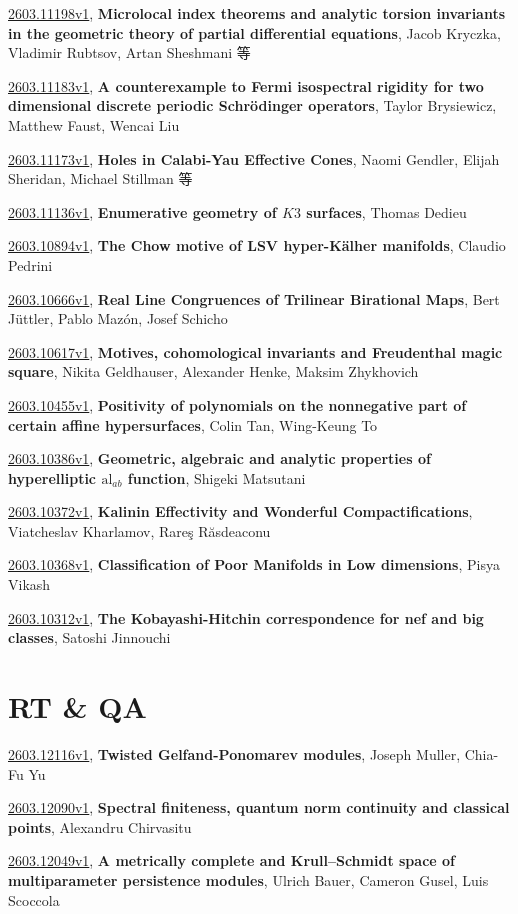 \documentclass[9pt, a4paper]{article}
\theoremstyle{plain}
\theoremstyle{definition}
\theoremstyle{remark}
\newcommand{\arxiv}[3]{\href{https://arxiv.org/abs/#1}{#1}, \textbf{\textcolor{arxivblue}{#2}}, #3}
\begin{document}
\arxiv{2603.11198v1}{Microlocal index theorems and analytic torsion invariants in the geometric theory of partial differential equations}{Jacob Kryczka, Vladimir Rubtsov, Artan Sheshmani 等}

\arxiv{2603.11183v1}{A counterexample to Fermi isospectral rigidity for two dimensional discrete periodic Schrödinger operators}{Taylor Brysiewicz, Matthew Faust, Wencai Liu}

\arxiv{2603.11173v1}{Holes in Calabi-Yau Effective Cones}{Naomi Gendler, Elijah Sheridan, Michael Stillman 等}

\arxiv{2603.11136v1}{Enumerative geometry of $K3$ surfaces}{Thomas Dedieu}

\arxiv{2603.10894v1}{The Chow motive of LSV hyper-Kälher manifolds}{Claudio Pedrini}

\arxiv{2603.10666v1}{Real Line Congruences of Trilinear Birational Maps}{Bert Jüttler, Pablo Mazón, Josef Schicho}

\arxiv{2603.10617v1}{Motives, cohomological invariants and Freudenthal magic square}{Nikita Geldhauser, Alexander Henke, Maksim Zhykhovich}

\arxiv{2603.10455v1}{Positivity of polynomials on the nonnegative part of certain affine hypersurfaces}{Colin Tan, Wing-Keung To}

\arxiv{2603.10386v1}{Geometric, algebraic and analytic properties of hyperelliptic $\mathrm{al}_{ab}$ function}{Shigeki Matsutani}

\arxiv{2603.10372v1}{Kalinin Effectivity and Wonderful Compactifications}{Viatcheslav Kharlamov, Rareş Răsdeaconu}

\arxiv{2603.10368v1}{Classification of Poor Manifolds in Low dimensions}{Pisya Vikash}

\arxiv{2603.10312v1}{The Kobayashi-Hitchin correspondence for nef and big classes}{Satoshi Jinnouchi}


\section{RT \& QA}
\arxiv{2603.12116v1}{Twisted Gelfand-Ponomarev modules}{Joseph Muller, Chia-Fu Yu}

\arxiv{2603.12090v1}{Spectral finiteness, quantum norm continuity and classical points}{Alexandru Chirvasitu}

\arxiv{2603.12049v1}{A metrically complete and Krull--Schmidt space of multiparameter persistence modules}{Ulrich Bauer, Cameron Gusel, Luis Scoccola}
\end{document}
